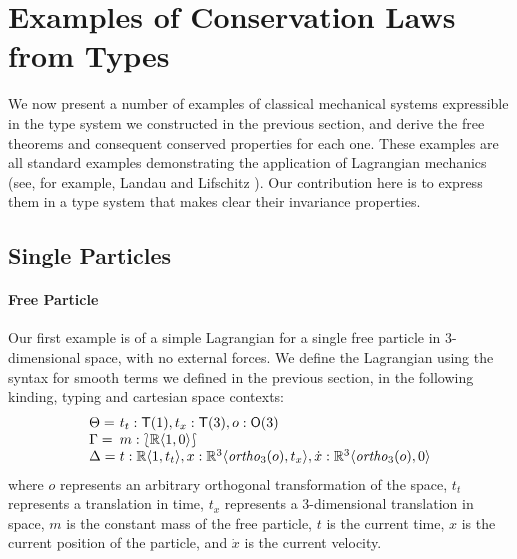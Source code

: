 \documentclass{sigplanconf}
\newcommand{\sepbar}{\mathrel|}
\newcommand{\typeOfCartSp}[1]{\lbag #1 \rbag}
\theoremstyle{examplestyle}
\begin{document}
\section{Examples of Conservation Laws from Types}
\label{sec:examples}

We now present a number of examples of classical mechanical systems
expressible in the type system we constructed in the previous section,
and derive the free theorems and consequent conserved properties for
each one. These examples are all standard examples demonstrating the
application of Lagrangian mechanics (see, for example, Landau and
Lifschitz \cite{landau60mechanics}). Our contribution here is to
express them in a type system that makes clear their invariance
properties.

\subsection{Single Particles}


\paragraph{Free Particle}

Our first example is of a simple Lagrangian for a single free particle
in $3$-dimensional space, with no external forces. We define the
Lagrangian using the syntax for smooth terms we defined in the
previous section, in the following kinding, typing and cartesian space
contexts:
\begin{displaymath}
  \begin{array}{l@{\hspace{0.3em}}l}
    \Theta = & t_t : \mathsf{T}(1), t_x : \mathsf{T}(3), o : \mathsf{O}(3) \\
    \Gamma = & m : \typeOfCartSp{\mathbb{R}\langle 1, 0 \rangle} \\
    \Delta = & t : \mathbb{R}\langle 1, t_t \rangle, x : \mathbb{R}^3\langle \mathit{ortho}_3(o), t_x \rangle, \dot{x} : \mathbb{R}^3\langle \mathit{ortho}_3(o), 0 \rangle
  \end{array}
\end{displaymath}
where $o$ represents an arbitrary orthogonal transformation of the
space, $t_t$ represents a translation in time, $t_x$ represents a
$3$-dimensional translation in space, $m$ is the constant mass of the
free particle, $t$ is the current time, $x$ is the current position of
the particle, and $\dot{x}$ is the current velocity.
\end{document}
